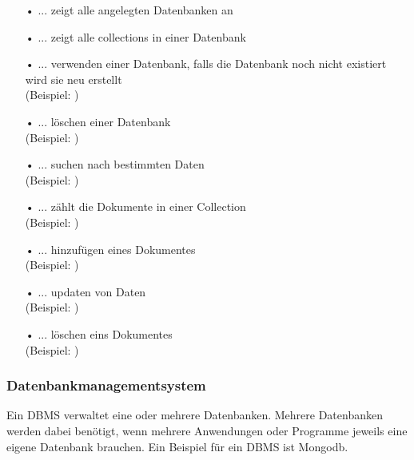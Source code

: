 \begin{itemize} 
\item[•] \textbf{} ... zeigt alle angelegten Datenbanken an
\item[•] \textbf{} ... zeigt alle collections in einer Datenbank
\item[•] \textbf{} ... verwenden einer Datenbank, falls die Datenbank noch nicht existiert wird sie neu erstellt 
\\     (Beispiel:  )
\item[•] \textbf{} ... löschen einer Datenbank
\\     (Beispiel:  )
\item[•] \textbf{} ... suchen nach bestimmten Daten 
\\     (Beispiel:  )
\item[•] \textbf{} ... zählt die Dokumente in einer Collection
\\     (Beispiel:  )
\item[•] \textbf{} ... hinzufügen eines Dokumentes
\\     (Beispiel:  )
\item[•] \textbf{} ... updaten von Daten
\\     (Beispiel:  )
\item[•] \textbf{} ... löschen eins Dokumentes
\\     (Beispiel:  )
\end{itemize}

\subsubsection{\ac{Datenbankmanagementsystem}}
Ein \ac{DBMS} verwaltet eine oder mehrere Datenbanken. Mehrere Datenbanken werden dabei benötigt, wenn mehrere Anwendungen oder Programme jeweils eine eigene Datenbank brauchen. Ein Beispiel für ein \ac{DBMS} ist Mongodb.

